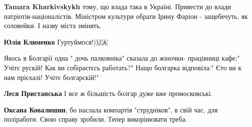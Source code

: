 \begin{itemize}
\begin{itemize}
 
\textbf{Tamara Kharkivskykh} тому, що влада така в Україні. Привести до влади патріотів-націоналістів. Міністром культури обрати Ірину Фаріон - защебечуть, як соловейки. І назву міста змінять.

 
\textbf{Юлія Клименко} Гуртуймося!)🇺🇦

\end{itemize}

 

Якось в Болгарії одна " дочь палковніка" сказала до жіночки- працівниці кафе:"
Учітє рускій! Как ви собіраєтєсь работать?" Нащо болгарка відповіла:" Єто ви к
нам прієхалі! Учітє болгарскій!"

\begin{itemize}
 
\textbf{Леся Пристанська} І все ж більшість болгар дуже вже промосковські.

 
\textbf{Оксана Ковалишин}, бо наслала компартія "струдніков", в свій час, для поліработи. Свою справу зробили. Тепер викорінювати треба.

 

\end{itemize}
\end{itemize}
